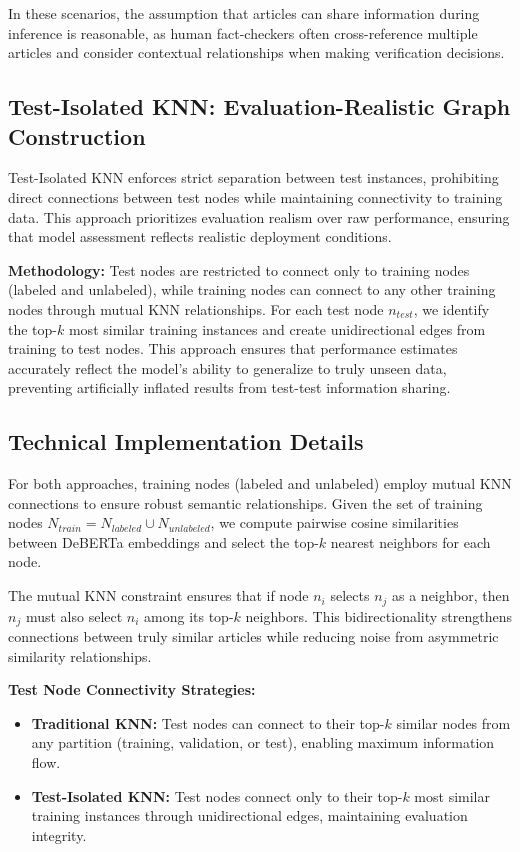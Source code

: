 In these scenarios, the assumption that articles can share information during inference is reasonable, as human fact-checkers often cross-reference multiple articles and consider contextual relationships when making verification decisions.

\subsection{Test-Isolated KNN: Evaluation-Realistic Graph Construction}

Test-Isolated KNN enforces strict separation between test instances, prohibiting direct connections between test nodes while maintaining connectivity to training data. This approach prioritizes evaluation realism over raw performance, ensuring that model assessment reflects realistic deployment conditions.

\textbf{Methodology:} Test nodes are restricted to connect only to training nodes (labeled and unlabeled), while training nodes can connect to any other training nodes through mutual KNN relationships. For each test node $n_{test}$, we identify the top-$k$ most similar training instances and create unidirectional edges from training to test nodes. This approach ensures that performance estimates accurately reflect the model's ability to generalize to truly unseen data, preventing artificially inflated results from test-test information sharing.

\subsection{Technical Implementation Details}

For both approaches, training nodes (labeled and unlabeled) employ mutual KNN connections to ensure robust semantic relationships. Given the set of training nodes $N_{train} = N_{labeled} \cup N_{unlabeled}$, we compute pairwise cosine similarities between DeBERTa embeddings and select the top-$k$ nearest neighbors for each node.

The mutual KNN constraint ensures that if node $n_i$ selects $n_j$ as a neighbor, then $n_j$ must also select $n_i$ among its top-$k$ neighbors. This bidirectionality strengthens connections between truly similar articles while reducing noise from asymmetric similarity relationships.

\textbf{Test Node Connectivity Strategies:}
\begin{itemize}
    \item \textbf{Traditional KNN:} Test nodes can connect to their top-$k$ similar nodes from any partition (training, validation, or test), enabling maximum information flow.
    \item \textbf{Test-Isolated KNN:} Test nodes connect only to their top-$k$ most similar training instances through unidirectional edges, maintaining evaluation integrity.
\end{itemize}

